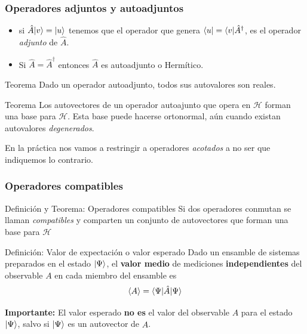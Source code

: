 \documentclass{beamer}
\begin{document}
    \begin{frame}
        \frametitle{Operadores adjuntos y autoadjuntos}
        \begin{itemize}
            \item si $\hat{A}| v \rangle = | u \rangle$ tenemos que el operador que genera $\langle u | = \langle v |\hat{A}^\dagger$, es el operador {\em adjunto} de $\hat{A}$.
            \item Si $\hat{A}=\hat{A}^\dagger$ entonces $\hat{A}$ es autoadjunto o Hermítico.
        \end{itemize}
        
        \begin{block}{Teorema}
            Dado un operador autoadjunto, todos sus autovalores son reales.
        \end{block}
    
        \begin{block}{Teorema}
            Los autovectores de un operador autoajunto que opera en $\mathcal{H}$ forman una base para $\mathcal{H}$. Esta base puede hacerse ortonormal, aún cuando existan autovalores {\em degenerados}.
        \end{block}
        En la práctica nos vamos a restringir a operadores {\em acotados} a no ser que indiquemos lo contrario.
        
    \end{frame}
    
    
    \begin{frame}
        \frametitle{Operadores compatibles}
        
        \begin{block}{Definición y Teorema: Operadores compatibles}
            Si dos operadores conmutan se llaman {\em compatibles} y comparten un conjunto de autovectores que forman una base para $\mathcal{H}$
        \end{block}
    
        \begin{block}{Definición: Valor de expectación o valor esperado}
            Dado un ensamble de sistemas preparados en el estado $| \Psi \rangle$, el {\bf valor medio} de mediciones {\bf independientes} del observable $A$ en cada miembro del ensamble es
            \[ \langle A \rangle = \langle \Psi | \hat{A} | \Psi \rangle \]
        \end{block}
        {\bf Importante:} El valor esperado {\bf no es} el valor del observable $A$ para el estado $| \Psi \rangle$, salvo si $| \Psi \rangle$ es un autovector de $\hat{A}$.
    
    
    \end{frame}
    
\end{document}
